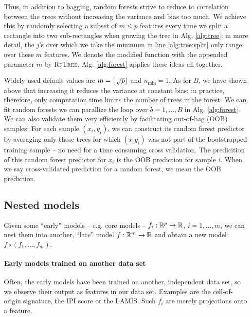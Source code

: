 Thus, in addition to bagging, random forests strive to reduce to correlation between the trees 
without increasing the variance and bias too much. We achieve this by randomly selecting a subset
of $m \leq p$ features every time we split a rectangle into two sub-rectangles when growing the 
tree in Alg. \ref{alg:tree}; in 
more detail, the $j$'s over which we take the minimum in line \ref{alg:tree:split} only range over 
these $m$ features. We denote the modified function with the appended parameter $m$ by 
\textsc{RfTree}. Alg. \ref{alg:forest} applies these ideas all together.



Widely used default values are $m = \lfloor\sqrt{p}\rfloor$ and $n_\text{min} = 1$. As for $B$, we have 
shown above that increasing it reduces the variance at constant bias; in practice, therefore, only 
computation time limits the number of trees in the forest. We can fit 
random forests we can parallize the loop over $b = 1, \ldots, B$ in Alg. \ref{alg:forest}. We can 
also validate them very efficiently by facilitating out-of-bag (OOB) samples: For each sample 
$(x_i, y_i)$, we can construct its random forest predictor by averaging only those trees for which 
$(x_, y_i)$ was not part of the bootstrapped training sample -- no need for a time consuming 
cross validation. The predicition of this random forest predictor for $x_i$ is the OOB prediction 
for sample $i$. When we say cross-validated prediction for a random forest, we mean the OOB
prediction.

\subsection{Nested models}\label{subsec:nested-models}

Given some ``early'' models -- e.g. core models -- $f_i: \mathbb{R}^p \to \mathbb{R}$, $i = 1, \ldots, m$, we can 
nest them into another, ``late'' model $f: \mathbb{R}^m \to \mathbb{R}$ and obtain a new model $f \circ 
(f_1, \ldots, f_m)$. 

\paragraph{Early models trained on another data set}
Often, the early models have been trained on another, independent data set, so we observe their 
output as features in our data set. Examples are the cell-of-origin signature, the IPI score or the 
LAMIS. Such $f_i$ are merely projections onto a feature.

